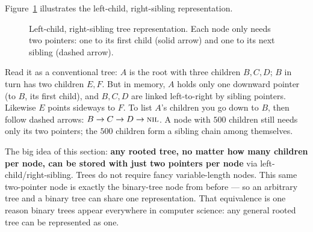 Figure~\ref{ch10:fig-lcrs} illustrates the left-child, right-sibling representation.

\begin{figure}[htbp]
\centering
{}
\caption{Left-child, right-sibling tree representation. Each node only needs two pointers: one to its first child (solid arrow) and one to its next sibling (dashed arrow).}
\label{ch10:fig-lcrs}
\end{figure}

Read it as a conventional tree: $A$ is the root with three children $B, C, D$; $B$ in turn has two children $E, F$. But in memory, $A$ holds only one downward pointer (to $B$, its first child), and $B, C, D$ are linked left-to-right by sibling pointers. Likewise $E$ points sideways to $F$. To list $A$'s children you go down to $B$, then follow dashed arrows: $B \to C \to D \to \textsc{nil}$. A node with $500$ children still needs only its two pointers; the $500$ children form a sibling chain among themselves.

\begin{focusbox}
The big idea of this section: \textbf{any rooted tree, no matter how many children per node, can be stored with just two pointers per node} via left-child/right-sibling. Trees do not require fancy variable-length nodes. This same two-pointer node is exactly the binary-tree node from before --- so an arbitrary tree and a binary tree can share one representation. That equivalence is one reason binary trees appear everywhere in computer science: any general rooted tree can be represented as one.
\end{focusbox}

